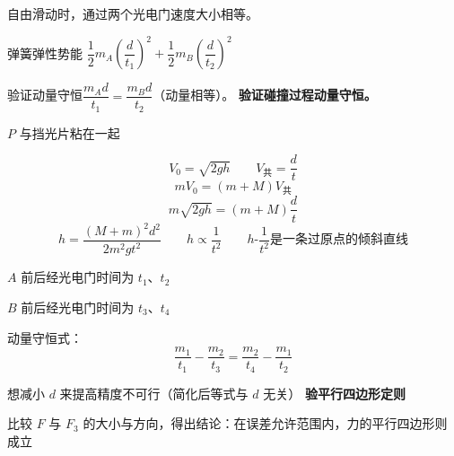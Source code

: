 自由滑动时，通过两个光电门速度大小相等。

弹簧弹性势能 $\dfrac12m_A\left(\dfrac{d}{t_1}\right)^2+\dfrac12m_B\left(\dfrac{d}{t_2}\right)^2$

验证动量守恒\quad $\dfrac{m_Ad}{t_1}=\dfrac{m_Bd}{t_2}$（动量相等）。
\textbf{验证碰撞过程动量守恒。}


$P$ 与挡光片粘在一起

\[ V_0=\sqrt{2gh}\qquad V_{\text{共}}=\frac{d}{t} \]
\[ mV_0=(m+M)V_{\text{共}} \]
\[ m\sqrt{2gh}=(m+M)\frac{d}{t} \]
\[ h=\frac{(M+m)^2d^2}{2m^2gt^2}\qquad h\propto\frac{1}{t^2}\qquad h\text{-}\frac{1}{t^2}\text{是一条过原点的倾斜直线} \]

$A$ 前后经光电门时间为 $t_1$、$t_2$

$B$ 前后经光电门时间为 $t_3$、$t_4$

动量守恒式：
\[ \frac{m_1}{t_1}-\frac{m_2}{t_3}=\frac{m_2}{t_4}-\frac{m_1}{t_2} \]

想减小 $d$ 来提高精度\quad 不可行\quad （简化后等式与 $d$ 无关）
\textbf{验平行四边形定则} %


比较 $F$ 与 $F_3$ 的大小与方向，得出结论：在误差允许范围内，力的平行四边形则成立
